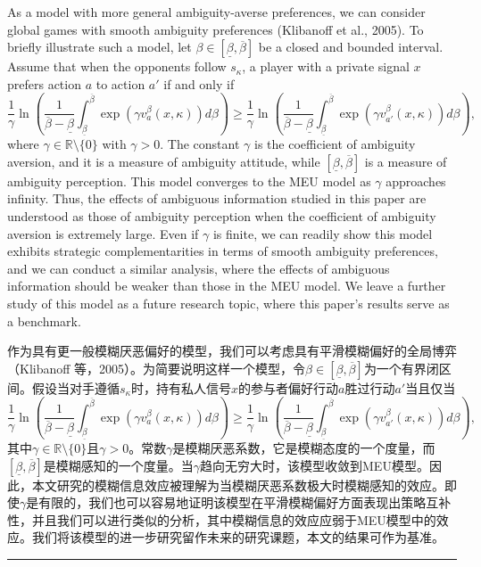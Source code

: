 \documentclass[12pt,a4paper]{article}
\newenvironment{original}
  {\par\medskip\noindent\color{black}\ignorespaces}
  {\par\medskip}
\newenvironment{translation}
  {\par\noindent\color{darkblue}\ignorespaces}
  {\par\medskip\noindent\hrule\par\medskip}
\theoremstyle{definition}
\theoremstyle{remark}
\begin{document}
\begin{original}
As a model with more general ambiguity-averse preferences, we can consider global games with smooth ambiguity preferences (Klibanoff et al., 2005). To briefly illustrate such a model, let $\beta \in [\underline{\beta}, \overline{\beta}]$ be a closed and bounded interval. Assume that when the opponents follow $s_\kappa$, a player with a private signal $x$ prefers action $a$ to action $a'$ if and only if
\[
\frac{1}{\gamma} \ln \left( \frac{1}{\overline{\beta} - \underline{\beta}} \int_{\underline{\beta}}^{\overline{\beta}} \exp(\gamma v_a^\beta(x, \kappa)) d\beta \right) \ge \frac{1}{\gamma} \ln \left( \frac{1}{\overline{\beta} - \underline{\beta}} \int_{\underline{\beta}}^{\overline{\beta}} \exp(\gamma v_{a'}^\beta(x, \kappa)) d\beta \right),
\]
where $\gamma \in \mathbb{R} \setminus \{0\}$ with $\gamma > 0$. The constant $\gamma$ is the coefficient of ambiguity aversion, and it is a measure of ambiguity attitude, while $[\underline{\beta}, \overline{\beta}]$ is a measure of ambiguity perception. This model converges to the MEU model as $\gamma$ approaches infinity. Thus, the effects of ambiguous information studied in this paper are understood as those of ambiguity perception when the coefficient of ambiguity aversion is extremely large. Even if $\gamma$ is finite, we can readily show this model exhibits strategic complementarities in terms of smooth ambiguity preferences, and we can conduct a similar analysis, where the effects of ambiguous information should be weaker than those in the MEU model. We leave a further study of this model as a future research topic, where this paper's results serve as a benchmark.
\end{original}
\begin{translation}
作为具有更一般模糊厌恶偏好的模型，我们可以考虑具有平滑模糊偏好的全局博弈（Klibanoff 等，2005）。为简要说明这样一个模型，令$\beta \in [\underline{\beta}, \overline{\beta}]$为一个有界闭区间。假设当对手遵循$s_\kappa$时，持有私人信号$x$的参与者偏好行动$a$胜过行动$a'$当且仅当
\[
\frac{1}{\gamma} \ln \left( \frac{1}{\overline{\beta} - \underline{\beta}} \int_{\underline{\beta}}^{\overline{\beta}} \exp(\gamma v_a^\beta(x, \kappa)) d\beta \right) \ge \frac{1}{\gamma} \ln \left( \frac{1}{\overline{\beta} - \underline{\beta}} \int_{\underline{\beta}}^{\overline{\beta}} \exp(\gamma v_{a'}^\beta(x, \kappa)) d\beta \right),
\]
其中$\gamma \in \mathbb{R} \setminus \{0\}$且$\gamma > 0$。常数$\gamma$是模糊厌恶系数，它是模糊态度的一个度量，而$[\underline{\beta}, \overline{\beta}]$是模糊感知的一个度量。当$\gamma$趋向无穷大时，该模型收敛到MEU模型。因此，本文研究的模糊信息效应被理解为当模糊厌恶系数极大时模糊感知的效应。即使$\gamma$是有限的，我们也可以容易地证明该模型在平滑模糊偏好方面表现出策略互补性，并且我们可以进行类似的分析，其中模糊信息的效应应弱于MEU模型中的效应。我们将该模型的进一步研究留作未来的研究课题，本文的结果可作为基准。
\end{translation}
\end{document}
